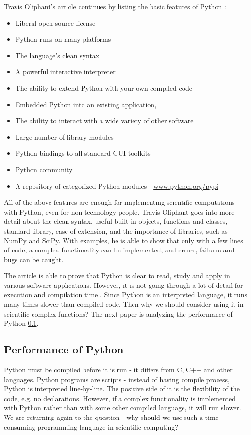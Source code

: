 \documentclass{article}
\begin{document}
Travis Oliphant's article continues by listing the basic features of Python  \cite{oliphant2007python}:

\begin{itemize}
\item Liberal open source license
\item Python runs on many platforms
\item The language’s clean syntax
\item A powerful interactive interpreter
\item The ability to extend Python with your own compiled code
\item Embedded Python into an existing application,
\item The ability to interact with a wide variety of other software
\item Large number of library modules
\item Python bindings to all standard GUI toolkits
\item Python community
\item A repository of categorized Python modules - \url{www.python.org/pypi}
\end{itemize}

All of the above features are enough for implementing scientific computations with Python, even for non-technology people. Travis Oliphant goes into more detail about the clean syntax, useful built-in objects, functions and classes, standard library, ease of extension, and the importance of libraries, such as NumPy and SciPy. With examples, he is able to show that only with a few lines of code, a complex functionality can be implemented, and errors, failures and bugs can be caught. 

The article is able to prove that Python is clear to read, study and apply in various software applications. However, it is not going through a lot of detail for execution and compilation time \cite{HansPython}. Since Python is an interpreted language, it runs many times slower than compiled code. Then why we should consider using it in scientific complex functions? The next paper is analyzing the performance of Python \ref{performance}.

\subsection{Performance of Python}
\label{performance}

Python must be compiled before it is run - it differs from C, C++ and other languages. Python programs are scripts - instead of having compile process, Python is interpreted line-by-line. The positive side of it is the flexibility of the code, e.g. no declarations. However, if a complex functionality is implemented with Python rather than with some other compiled language, it will run slower. We are returning again to the question - why should we use such a time-consuming programming language in scientific computing? \cite{ScottPython}
\end{document}
